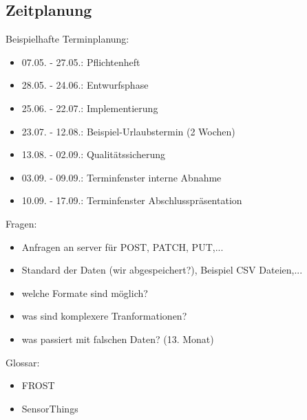 \documentclass[12 pt]{article}
\begin{document}
\subsection{Zeitplanung}
Beispielhafte Terminplanung: \\
\begin{itemize}
	\item 07.05. - 27.05.: Pflichtenheft
	\item 28.05. - 24.06.: Entwurfsphase
	\item 25.06. - 22.07.: Implementierung
	\item 23.07. - 12.08.: Beispiel-Urlaubstermin (2 Wochen)
	\item 13.08. - 02.09.: Qualitätssicherung
	\item 03.09. - 09.09.: Terminfenster interne Abnahme
	\item 10.09. - 17.09.: Terminfenster Abschlusspräsentation
\end{itemize}




Fragen:

\begin{itemize}
\item Anfragen an server für POST, PATCH, PUT,...
\item Standard der Daten (wir abgespeichert?), Beispiel CSV Dateien,...
\item welche Formate sind möglich?
\item was sind komplexere Tranformationen?
\item was passiert mit falschen Daten? (13. Monat)
\end{itemize}


Glossar:
\begin{itemize}
\item FROST
\item SensorThings
\end{itemize}
\end{document}
